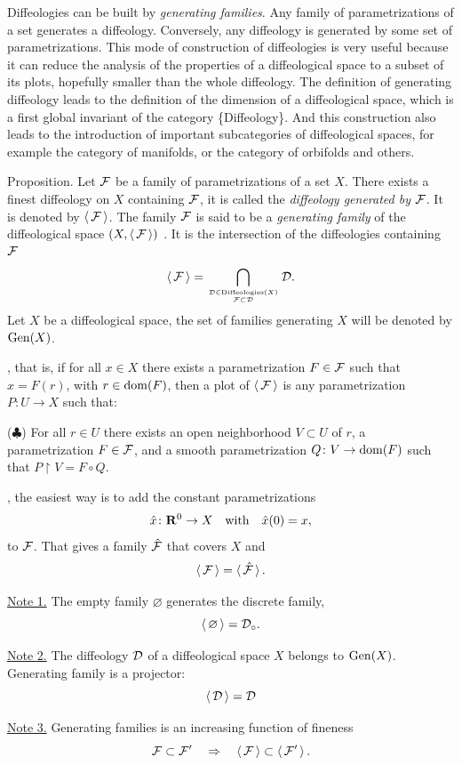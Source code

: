 Diffeologies can be built by \emph{generating families}.
Any family of parametrizations of a set generates a diffeology.
Conversely,
any diffeology is generated by some set of parametrizations.
This mode of construction of diffeologies is very useful because it can reduce the analysis of the properties of a diffeological space to a subset of its plots,
hopefully smaller than the whole diffeology.
The definition of generating diffeology leads to the definition of the dimension of a diffeological space,
which is a first global invariant of the category \{Diffeology\}.
And this construction also leads to the introduction of important subcategories of diffeological spaces,
for example the category of manifolds,
or the category of orbifolds and others.

\begin{Article}{Proposition.}{}
  Let $\mathcal{F}$ be a family of parametrizations of a set $X$.
  There exists a finest diffeology on $X$ containing $\mathcal{F}$,
  it is called the \emph{diffeology generated by $\mathcal{F}$}.
  It is denoted by $\mathop\langle\mathcal{F}\mathop\rangle$.
  The family $\mathcal{F}$ is said to be a \emph{generating family} of the diffeological space $(X,\mathop\langle\mathcal{F}\mathop\rangle)$ \cite{PIZ07}.
  It is the intersection of the diffeologies containing $\mathcal{F}$
  $$%
    \gen{\cF} = \bigcap_{\cD \in \Difflg(X) \atop \cF \subset \cD} \cD.
    $$%
  Let $X$ be a diffeological space,
  the set of families generating $X$ will be denoted by $\operatorname{Gen}(X)$.
  
  ,
  that is,
  if for all $x \in X$ there exists a parametrization $F \in \mathcal{F}$ such that $x = F(r)$,
  with $r \in \mathrm{dom}(F)$,
  then a plot of $\mathop\langle\mathcal{F}\mathop\rangle$ is any parametrization $P \colon U \to X$ such that:
  
  {\upshape($\clubsuit$)}  For all $r \in U$ there exists an open neighborhood $V \subset U$ of $r$,
  a parametrization $F \in \mathcal{F}$,
  and a smooth parametrization $Q \colon V \to \mathrm{dom}(F)$ such that $P \restriction V = F \circ Q$.
  
  ,
  the easiest way is to add the constant parametrizations
  $$%
    \hat x \colon \RR^0 \to X
    \quad \text{with} \quad
    \hat x(0) = x,
    $$%
  to $\mathcal{F}$.
  That gives a family $\hat{\mathcal{F}}$ that covers $X$ and
  $$%
    \gen{\cF} = \gen{\hat\cF}.
    $$%
  
  \uline{Note 1.}  The empty family $\varnothing$ generates the discrete family,
  $$%
    \gen{\varnothing} = \cD_\circ.
    $$%
  
  \uline{Note 2.}  The diffeology $\mathcal{D}$ of a diffeological space $X$ belongs to $\operatorname{Gen}(X)$.
  Generating family is a projector:
  $$%
    \gen{\cD} = \cD
    $$%
  
  \uline{Note 3.}  Generating families is an increasing function of fineness
  $$%
    \cF \subset \cF' \quad \Rightarrow \quad \gen{\cF} \subset \gen{\cF'}.
    $$%
\end{Article}

